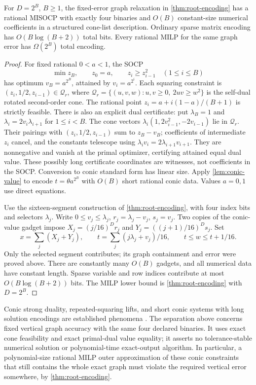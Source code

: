 \begin{theorem}
\label{thm:root-conic-separation}
For $D=2^B$, $B\ge1$, the fixed-error graph relaxation in
\cref{thm:root-encoding} has a rational MISOCP with exactly four
binaries and $O(B)$ constant-size numerical coefficients in a structured
cone-list description. Ordinary sparse matrix encoding has
$O(B\log(B+2))$ total bits. Every rational MILP for the same graph
error has $\Omega(2^B)$ total encoding.
\end{theorem}
\begin{proof}
For fixed rational $0<a<1$, the SOCP
\[
 \min z_B,\qquad z_0=a,\qquad z_i\ge z_{i-1}^2\quad(1\le i\le B)
\]
has optimum $v_B=a^{2^B}$, attained by $v_i=a^{2^i}$.
Each squaring constraint is
$(z_i,1/2,z_{i-1})\in\mathcal Q_r$, where
$\mathcal Q_r=\{(u,v,w):u,v\ge0,\ 2uv\ge w^2\}$ is the
self-dual rotated second-order cone. The rational point
$z_i=a+i(1-a)/(B+1)$ is strictly feasible. There is also an explicit
dual certificate: put $\lambda_B=1$ and
$\lambda_i=2v_i\lambda_{i+1}$ for $1\le i<B$.
The cone vectors
$\lambda_i(1,2v_{i-1}^2,-2v_{i-1})$ lie in $\mathcal Q_r$.
Their pairings with $(z_i,1/2,z_{i-1})$ sum to $z_B-v_B$;
coefficients of intermediate $z_i$ cancel, and the constants telescope
using $\lambda_iv_i=2\lambda_{i+1}v_{i+1}$.
They are nonnegative and vanish at the primal optimizer, certifying
attained equal dual value. These possibly long certificate coordinates
are witnesses, not coefficients in the SOCP. Conversion to conic
standard form has linear size. Apply \cref{lem:conic-value} to encode
$t=\theta a^{2^B}$ with $O(B)$ short rational conic data. Values
$a=0,1$ use direct equations.

Use the sixteen-segment construction of \cref{thm:root-encoding},
with four index bits and selectors $\lambda_j$. Write
$0\le v_j\le\lambda_j$, $r_j=\lambda_j-v_j$, $s_j=v_j$.
Two copies of the conic-value gadget impose
$X_j=(j/16)^D r_j$ and $Y_j=((j+1)/16)^D s_j$.
Set
\[
 x=\sum_j(X_j+Y_j),\qquad
 t=\sum_j(j\lambda_j+v_j)/16,\qquad t\le w\le t+1/16.
\]
Only the selected segment contributes; its graph containment and error
were proved above. There are constantly many $O(B)$ gadgets, and
all numerical data have constant length. Sparse variable and row
indices contribute at most $O(B\log(B+2))$ bits. The MILP lower
bound is \cref{thm:root-encoding} with $D=2^B$.
\end{proof}

Conic strong duality, repeated-squaring lifts, and short conic systems
with long solution encodings are established phenomena
\citep{boyd2004,odonnell2017,wang2024}. The separation above concerns
fixed vertical graph accuracy with the same four declared binaries.
It uses exact cone feasibility and exact primal-dual value equality;
it asserts no tolerance-stable numerical solution or polynomial-time
exact-output algorithm. In particular, a polynomial-size rational MILP
outer approximation of these conic constraints that still contains the
whole exact graph must violate the required vertical error somewhere,
by \cref{thm:root-encoding}.
